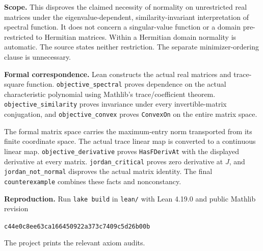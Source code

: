 \documentclass[11pt]{article}
\begin{document}
\textbf{Scope.}
This disproves the claimed necessity of normality on unrestricted
real matrices under the eigenvalue-dependent, similarity-invariant
interpretation of spectral function. It does not concern a
singular-value function or a domain pre-restricted to Hermitian
matrices. Within a Hermitian domain normality is automatic.
The source states neither restriction.
The separate minimizer-ordering clause is unnecessary.

\textbf{Formal correspondence.}
Lean constructs the actual real matrices and trace-square function.
\texttt{objective\_spectral} proves dependence on the actual
characteristic polynomial using Mathlib's trace/coefficient theorem.
\texttt{objective\_similarity} proves invariance under every
invertible-matrix conjugation, and \texttt{objective\_convex}
proves \texttt{ConvexOn} on the entire matrix space.

The formal matrix space carries the maximum-entry norm transported
from its finite coordinate space. The actual trace linear map is
converted to a continuous linear map.
\texttt{objective\_derivative} proves \texttt{HasFDerivAt}
with the displayed derivative at every matrix.
\texttt{jordan\_critical} proves zero derivative at $J$, and
\texttt{jordan\_not\_normal} disproves the actual matrix identity.
The final \texttt{counterexample} combines these facts and
nonconstancy.

\textbf{Reproduction.}
Run \texttt{lake build} in \texttt{lean/} with Lean 4.19.0 and
public Mathlib revision
\begin{center}\small\texttt{c44e0c8ee63ca166450922a373c7409c5d26b00b}\end{center}
The project prints the relevant axiom audits.
\end{document}

